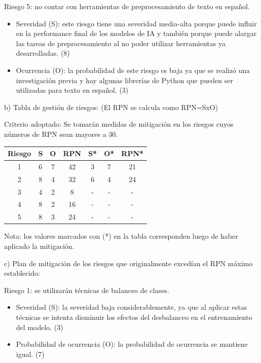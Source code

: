 \documentclass[
11pt, %
]{charter}
\begin{document}
Riesgo 5: no contar con herramientas de preprocesamiento de texto en español.
\begin{itemize}
	\item Severidad (S): este riesgo tiene una severidad media-alta porque puede influir en la performance final de los modelos de IA y también porque puede alargar las tareas de preprocesamiento al no poder utilizar herramientas ya desarrolladas. (8)
	\item Ocurrencia (O): la probabilidad de este riesgo es baja ya que se realizó una investigación previa y hay algunas librerías de Python que pueden ser utilizadas para texto en español. (3)
\end{itemize}


b) Tabla de gestión de riesgos: (El RPN se calcula como RPN=SxO)

Criterio adoptado: 
Se tomarán medidas de mitigación en los riesgos cuyos números de RPN sean mayores a 30.

\begin{table}[H]
\centering
\begin{tabular}{@{}|c|c|c|c|c|c|c|@{}}
\hline
\rowcolor[HTML]{C0C0C0} 
Riesgo &  S  &  O  &  RPN  &  S*  &  O*  &  RPN* \\ \hline
   1   &  6  &  7  &  42  &   3   &  7   &  21   \\ \hline
   2   &  8  &  4  &  32  &   6   &  4   &  24   \\ \hline
   3   &  4  &  2  &  8   &   -   &  -   &   -   \\ \hline
   4   &  8  &  2  &  16  &   -   &  -   &   -   \\ \hline
   5   &  8  &  3  &  24  &   -   &  -   &   -   \\ \hline
\end{tabular}%
\end{table}



Nota: los valores marcados con (*) en la tabla corresponden luego de haber aplicado la mitigación.

c) Plan de mitigación de los riesgos que originalmente excedían el RPN máximo establecido:
 
Riesgo 1: se utilizarán técnicas de balanceo de clases.
\begin{itemize}
	\item Severidad (S): la severidad baja considerablemente, ya que al aplicar estas técnicas se intenta disminuir los efectos del desbalanceo en el entrenamiento del modelo. (3)
  	\item Probabilidad de ocurrencia (O): la probabilidad de ocurrencia se mantiene igual. (7)
\end{itemize}
\end{document}

